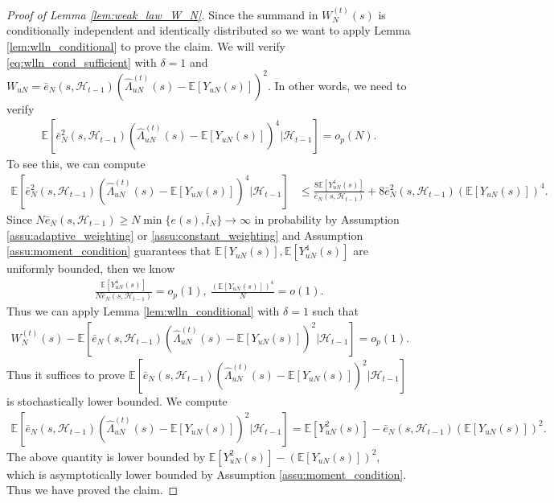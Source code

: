 \documentclass[12pt]{article}
\newcommand{\E}{\mathbb E}								%
\begin{document}
\begin{proof}[Proof of Lemma \ref{lem:weak_law_W_N}]
	Since the summand in $W_N^{(t)}(s)$ is conditionally independent and identically distributed so we want to apply Lemma \ref{lem:wlln_conditional} to prove the claim. We will verify \eqref{eq:wlln_cond_sufficient} with $\delta=1$ and $W_{uN}=\bar e_N(s,\mathcal{H}_{t-1})(\hat{\Lambda}_{uN}^{(t)}(s)-\E[Y_{uN}(s)])^2$. In other words, we need to verify 
	\begin{align*}
		\E\left[\bar e_N^2(s,\mathcal{H}_{t-1})(\hat{\Lambda}_{uN}^{(t)}(s)-\E[Y_{uN}(s)])^4|\mathcal{H}_{t-1}\right]=o_p(N).
	\end{align*}
	To see this, we can compute 
	\begin{align*}
		\E\left[\bar e_N^2(s,\mathcal{H}_{t-1})(\hat{\Lambda}_{uN}^{(t)}(s)-\E[Y_{uN}(s)])^4|\mathcal{H}_{t-1}\right]
		&
		\leq \frac{8\E[Y_{uN}^4(s)]}{\bar e_N(s,\mathcal{H}_{t-1})}+8\bar e_N^2(s,\mathcal{H}_{t-1})(\E[Y_{uN}(s)])^4.
	\end{align*}
	Since $N\bar e_N(s,\mathcal{H}_{t-1})\geq N\min\{e(s),\bar l_N\}\rightarrow\infty$ in probability by Assumption \ref{assu:adaptive_weighting} or \ref{assu:constant_weighting} and Assumption \ref{assu:moment_condition} guarantees that $\E[Y_{uN}(s)],\E[Y_{uN}^4(s)]$ are uniformly bounded, then we know 
	\begin{align*}
		\frac{\E[Y_{uN}^4(s)]}{N\bar e_N(s,\mathcal{H}_{t-1})}=o_p(1),\ \frac{(\E[Y_{uN}(s)])^4}{N}=o(1).
	\end{align*}
	Thus we can apply Lemma \ref{lem:wlln_conditional} with $\delta=1$ such that 
	\begin{align*}
		W_N^{(t)}(s)-\E[\bar e_N(s,\mathcal{H}_{t-1})(\hat{\Lambda}_{uN}^{(t)}(s)-\E[Y_{uN}(s)])^2|\mathcal{H}_{t-1}]=o_p(1).
	\end{align*}
	Thus it suffices to prove $\E[\bar e_N(s,\mathcal{H}_{t-1})(\hat{\Lambda}_{uN}^{(t)}(s)-\E[Y_{uN}(s)])^2|\mathcal{H}_{t-1}]$ is stochastically lower bounded. We compute 
	\begin{align*}
		\E[\bar e_N(s,\mathcal{H}_{t-1})(\hat{\Lambda}_{uN}^{(t)}(s)-\E[Y_{uN}(s)])^2|\mathcal{H}_{t-1}]=\E[Y_{uN}^2(s)]-\bar e_N(s,\mathcal{H}_{t-1})(\E[Y_{uN}(s)])^2.
	\end{align*}
	The above quantity is lower bounded by $\E[Y_{uN}^2(s)]-(\E[Y_{uN}(s)])^2$, which is asymptotically lower bounded by Assumption \ref{assu:moment_condition}. Thus we have proved the claim.
\end{proof}
\end{document}
